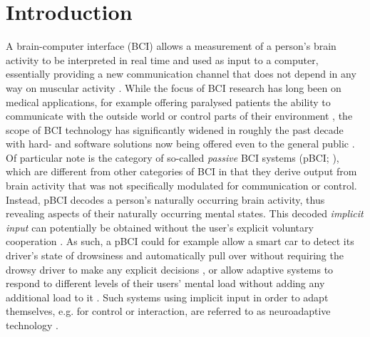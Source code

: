 \clearpage


\pagestyle{salval}


\section{Introduction}

A brain-computer interface (BCI) allows a measurement of a person's brain activity to be interpreted in real time and used as input to a computer, essentially providing a new communication channel that does not depend in any way on muscular activity \cite{wolpaw2012newsun}. While the focus of BCI research has long been on medical applications, for example offering paralysed patients the ability to communicate with the outside world or control parts of their environment \cite{birbaumer2006commcontrol,vansteensel2016alsimplant},
the scope of BCI technology has significantly widened in roughly the past decade with hard- and software solutions now being offered even to the general public \cite{ienca2018brainleaks}. Of particular note is the category of so-called \emph{passive} BCI systems (pBCI; ), which are different from other categories of BCI in that they derive output from brain activity that was not specifically modulated for communication or control. Instead, pBCI decodes a person's naturally occurring brain activity, thus revealing aspects of their naturally occurring mental states. This decoded \emph{implicit input} can potentially be obtained without the user's explicit voluntary cooperation \cite{schmidt2000,rotting2009implicit,zander2014implicit}. As such, a pBCI could for example allow a smart car to detect its driver's state of drowsiness and automatically pull over without requiring the drowsy driver to make any explicit decisions \cite{zander2017dry}, or allow adaptive systems to respond to different levels of their users' mental load without adding any additional load to it \cite{yuksel2016bach,ewing2016tetris,zander2017surgery}. Such systems using implicit input in order to adapt themselves, e.g. for control or interaction, are referred to as neuroadaptive technology \cite{zander2016nat}.

